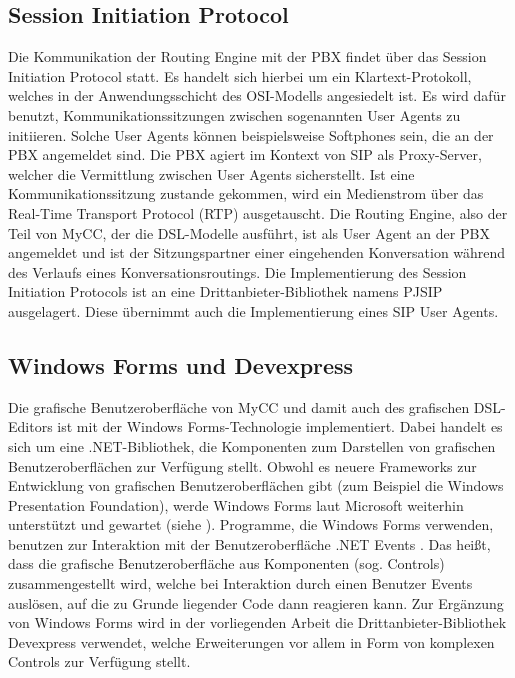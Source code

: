 \subsection{Session Initiation Protocol}
\label{subsec:Session Initiation Protocol}
Die Kommunikation der Routing Engine mit der PBX findet über das Session Initiation Protocol statt. Es handelt sich hierbei um ein Klartext-Protokoll, welches in der Anwendungsschicht des OSI-Modells angesiedelt ist. Es wird dafür benutzt, Kommunikationssitzungen zwischen sogenannten User Agents zu initiieren. Solche User Agents können beispielsweise Softphones sein, die an der PBX angemeldet sind. Die PBX agiert im Kontext von SIP als Proxy-Server, welcher die Vermittlung zwischen User Agents sicherstellt. Ist eine Kommunikationssitzung zustande gekommen, wird ein Medienstrom über das Real-Time Transport Protocol (RTP) ausgetauscht. Die Routing Engine, also der Teil von MyCC, der die DSL-Modelle ausführt, ist als User Agent an der PBX angemeldet und ist der Sitzungspartner einer eingehenden Konversation während des Verlaufs eines Konversationsroutings. Die Implementierung des Session Initiation Protocols ist an eine Drittanbieter-Bibliothek namens PJSIP ausgelagert. Diese übernimmt auch die Implementierung eines SIP User Agents. 

\subsection{Windows Forms und Devexpress}
Die grafische Benutzeroberfläche von MyCC und damit auch des grafischen DSL-Editors ist mit der Windows Forms-Technologie implementiert. Dabei handelt es sich um eine .NET-Bibliothek, die Komponenten zum Darstellen von grafischen Benutzeroberflächen zur Verfügung stellt. Obwohl es neuere Frameworks zur Entwicklung von grafischen Benutzeroberflächen gibt (zum Beispiel die Windows Presentation Foundation), werde Windows Forms laut Microsoft weiterhin unterstützt und gewartet (siehe \cite{Allen:14}). Programme, die Windows Forms verwenden, benutzen zur Interaktion mit der Benutzeroberfläche .NET Events \cite[S. 171ff]{Platt:03}. Das heißt, dass die grafische Benutzeroberfläche aus Komponenten (sog. Controls) zusammengestellt wird, welche bei Interaktion durch einen Benutzer Events auslösen, auf die zu Grunde liegender Code dann reagieren kann. Zur Ergänzung von Windows Forms wird in der vorliegenden Arbeit die Drittanbieter-Bibliothek Devexpress verwendet, welche Erweiterungen vor allem in Form von komplexen Controls zur Verfügung stellt. 

